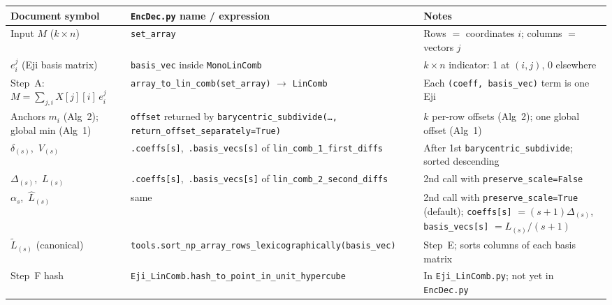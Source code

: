 \documentclass[11pt,a4paper]{article}
\newcommand{\encdecpy}{\texttt{EncDec.py}}
\newcommand{\eji}[2]{e^{#1}_{#2}}       %
\newcommand{\canon}[1]{\widetilde{#1}}  %
\begin{document}
\begin{center}
\small
\setlength{\tabcolsep}{5pt}
\renewcommand{\arraystretch}{1.35}
\begin{tabular}{p{3.4cm} p{6cm} p{4.8cm}}
\toprule
\textbf{Document symbol} & \textbf{\encdecpy{} name / expression} & \textbf{Notes} \\
\midrule
Input $M$ ($k{\times}n$) &
  \texttt{set\_array} &
  Rows $= $ coordinates $i$; columns $= $ vectors $j$ \\[3pt]

$\eji{j}{i}$ (Eji basis matrix) &
  \texttt{basis\_vec} inside \texttt{MonoLinComb} &
  $k{\times}n$ indicator: 1 at $(i,j)$, 0 elsewhere \\[3pt]

Step~A: $M = \sum_{j,i} X[j][i]\,\eji{j}{i}$ &
  \texttt{array\_to\_lin\_comb(set\_array)} $\to$ \texttt{LinComb} &
  Each \texttt{(coeff, basis\_vec)} term is one Eji \\[3pt]

Anchors $m_i$ (Alg~2); global min (Alg~1) &
  \texttt{offset} returned by \texttt{barycentric\_subdivide(\ldots,}
  \texttt{return\_offset\_separately=True)} &
  $k$ per-row offsets (Alg~2); one global offset (Alg~1) \\[3pt]

$\delta_{(s)}$,\ $V_{(s)}$ &
  \texttt{.coeffs[s]},\ \texttt{.basis\_vecs[s]} of
  \texttt{lin\_comb\_1\_first\_diffs} &
  After 1st \texttt{barycentric\_subdivide}; sorted descending \\[3pt]

$\Delta_{(s)}$,\ $L_{(s)}$ &
  \texttt{.coeffs[s]},\ \texttt{.basis\_vecs[s]} of
  \texttt{lin\_comb\_2\_second\_diffs} &
  2nd call with \texttt{preserve\_scale=False} \\[3pt]

$\alpha_s$,\ $\hat{L}_{(s)}$ &
  same &
  2nd call with \texttt{preserve\_scale=True} (default);
  \texttt{coeffs[s]} $=(s{+}1)\Delta_{(s)}$,
  \texttt{basis\_vecs[s]} $=L_{(s)}/(s{+}1)$ \\[3pt]

$\canon{L}_{(s)}$ (canonical) &
  \texttt{tools.sort\_np\_array\_rows\_}\newline\texttt{lexicographically(basis\_vec)} &
  Step~E; sorts columns of each basis matrix \\[3pt]

Step~F hash &
  \texttt{Eji\_LinComb.}\newline\texttt{hash\_to\_point\_in\_unit\_hypercube} &
  In \texttt{Eji\_LinComb.py}; not yet in \encdecpy \\
\bottomrule
\end{tabular}
\end{center}
\end{document}
